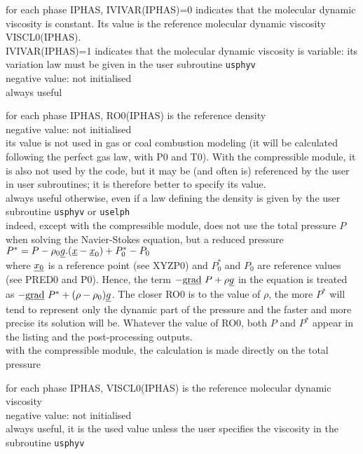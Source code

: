 {for each phase IPHAS, IVIVAR(IPHAS)=0 indicates that the molecular
dynamic viscosity is constant. Its value is the reference molecular
dynamic viscosity VISCL0(IPHAS).\\
IVIVAR(IPHAS)=1 indicates that the molecular dynamic viscosity is
variable: its variation law must be given in the user subroutine
\texttt{usphyv}\\
negative value: not initialised\\
always useful}

{for each phase IPHAS, RO0(IPHAS) is the reference density\\
negative value: not initialised\\
its value is not used in gas or coal combustion modeling (it
will be calculated following the perfect gas law, with P0 and T0). With the
compressible module, it is also not used by the code, but it may be (and often
is) referenced by the user in user subroutines; it is therefore better to
specify its value.\\
always useful otherwise, even if a law defining the density is given by
the user subroutine \texttt{usphyv} or \texttt{uselph}\\
indeed, except with the
compressible module, \CS does not
use the total pressure $P$ when solving the Navier-Stokes equation, but a
reduced pressure \\
$P^*=P-\rho_0\underline{g}.(\underline{x}-\underline{x}_0)+P^*_0-P_0$\\
where
$\underline{x_0}$ is a reference point (see XYZP0) and $P^*_0$ and $P_0$ are
reference values (see PRED0 and P0). Hence, the term
$-\text{g}\underline{\text{rad}}\ {P}+\rho\underline{g}$ in the equation is treated as
$-\text{g}\underline{\text{rad}}\ {P^*}+(\rho-\rho_0)\underline{g}$. The closer RO0 is to the value of $\rho$,
the more $P^*$ will tend to represent only the dynamic part of the pressure and
the faster and more precise its solution will be. Whatever the value of RO0,
both $P$ and $P^*$ appear in the listing and the post-processing outputs.\\
with the compressible module, the calculation is made directly on the total
pressure}

{for each phase IPHAS,  VISCL0(IPHAS) is the reference molecular dynamic
viscosity\\
negative value: not initialised\\
always useful, it is the used value unless the user specifies the
viscosity in the subroutine \texttt{usphyv}}


